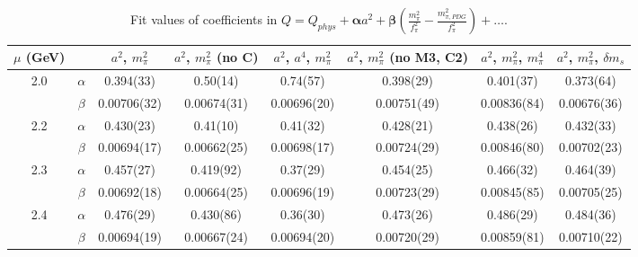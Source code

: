 \documentclass[12pt]{extarticle}
\begin{document}
\begin{table}[h!]
\begin{center}
\begin{tabular}{|c c|c|c|c|c|c|c|}
\hline
$\mu$ (GeV) &  & $a^2$, $m_\pi^2$& $a^2$, $m_\pi^2$ (no C)& $a^2$, $a^4$, $m_\pi^2$& $a^2$, $m_\pi^2$ (no M3, C2)& $a^2$, $m_\pi^2$, $m_\pi^4$& $a^2$, $m_\pi^2$, $\delta m_s$\\
\hline
\multirow{2}{0.5in}{2.0} & $\alpha$ & 0.394(33)& 0.50(14)& 0.74(57)& 0.398(29)& 0.401(37)& 0.373(64)\\
 & $\beta$ & 0.00706(32)& 0.00674(31)& 0.00696(20)& 0.00751(49)& 0.00836(84)& 0.00676(36)\\
\hline
\multirow{2}{0.5in}{2.2} & $\alpha$ & 0.430(23)& 0.41(10)& 0.41(32)& 0.428(21)& 0.438(26)& 0.432(33)\\
 & $\beta$ & 0.00694(17)& 0.00662(25)& 0.00698(17)& 0.00724(29)& 0.00846(80)& 0.00702(23)\\
\hline
\multirow{2}{0.5in}{2.3} & $\alpha$ & 0.457(27)& 0.419(92)& 0.37(29)& 0.454(25)& 0.466(32)& 0.464(39)\\
 & $\beta$ & 0.00692(18)& 0.00664(25)& 0.00696(19)& 0.00723(29)& 0.00845(85)& 0.00705(25)\\
\hline
\multirow{2}{0.5in}{2.4} & $\alpha$ & 0.476(29)& 0.430(86)& 0.36(30)& 0.473(26)& 0.486(29)& 0.484(36)\\
 & $\beta$ & 0.00694(19)& 0.00667(24)& 0.00694(20)& 0.00720(29)& 0.00859(81)& 0.00710(22)\\
\hline
\end{tabular}
\caption{Fit values of coefficients in $Q = Q_{phys} + \mathbf{\alpha} a^2 + \mathbf{\beta}\left(\frac{m_\pi^2}{f_\pi^2}-\frac{m_{\pi,PDG}^2}{f_\pi^2}\right) + \ldots$.}
\end{center}
\end{table}
























\clearpage
\end{document}
